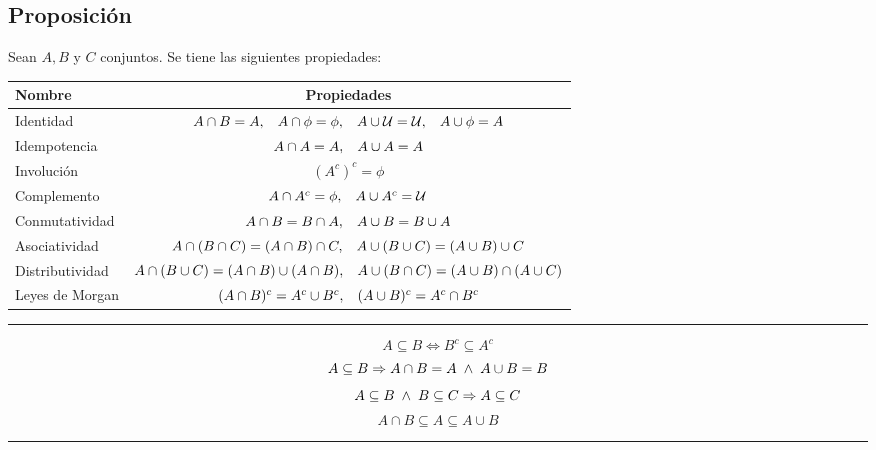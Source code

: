 \subsection{Proposición}
Sean $A, B$ y $C$ conjuntos. Se tiene las siguientes propiedades:
\begingroup
\setlength{\tabcolsep}{5pt} %
\renewcommand{\arraystretch}{1.5} %
\begin{center}
\begin{tabular}{l|c}
\bf Nombre&\bf Propiedades\\ \hline
Identidad&$A \cap B = A,\hspace{0.3cm} A \cap \phi = \phi, \hspace{0.3cm} A \cup \mathcal{U} = \mathcal{U}, \hspace{0.3cm} A \cup \phi = A$\\
Idempotencia&$A \cap A = A, \hspace{0.3cm} A \cup A = A$\\
Involución&$(A^c)^c = \phi$\\
Complemento&$A \cap A^c = \phi, \hspace{0.3cm} A \cup A^c = \mathcal{U}$\\
Conmutatividad&$A \cap B = B \cap A, \hspace{0.3cm} A \cup B = B \cup A $\\
Asociatividad&$ A \cap (B \cap C) = (A \cap B) \cap C, \hspace{0.3cm} A \cup (B \cup C) = (A \cup B) \cup C $\\
Distributividad&$A \cap (B \cup C) = (A \cap B) \cup (A \cap B), \hspace{0.3cm} A \cup (B \cap C) = (A \cup B) \cap (A \cup C)$\\
Leyes de Morgan&$(A \cap B)^c = A^c \cup B^c, \hspace{0.3cm} (A \cup B)^c = A^c \cap B^c$
\end{tabular}
\end{center}
\endgroup

\hrule
$$A \subseteq B \Leftrightarrow B^c \subseteq A^c$$
$$A \subseteq B \Rightarrow A \cap B = A  \hspace{0.1cm} \wedge \hspace{0.1cm}  A \cup B =B$$
$$A \subseteq B \hspace{0.1cm} \wedge \hspace{0.1cm} B \subseteq C \Rightarrow A \subseteq C$$
$$A \cap B \subseteq A \subseteq A \cup B$$
\hrule
